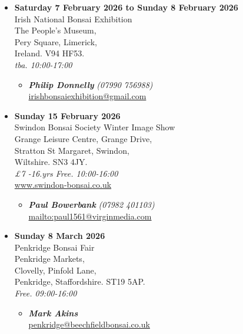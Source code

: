 \begin{itemize}
    \item \textbf{Saturday 7 February 2026 to Sunday 8 February 2026}
    \\
    Irish National Bonsai Exhibition \\
    The People's Museum, \\
    Pery Square, Limerick, \\
    Ireland. V94 HF53.
    \\
    \emph{tba. 10:00-17:00}
    \begin{itemize}
        \item \textbf{\emph{Philip Donnelly}} \emph{(07990 756988)} \\
        \href{mailto:irishbonsaiexhibition@gmail.com}{irishbonsaiexhibition@gmail.com} 
    \end{itemize}

    \item \textbf{Sunday 15 February 2026}
    \\
    Swindon Bonsai Society Winter Image Show \\
    Grange Leisure Centre, Grange Drive, \\
    Stratton St Margaret, Swindon, \\
    Wiltshire. SN3 4JY.
    \\
    \emph{£7 -16.yrs Free. 10:00-16:00}
    \\
    \href{http://www.swindon-bonsai.co.uk/}{www.swindon-bonsai.co.uk}
    \begin{itemize}
        \item \textbf{\emph{Paul Bowerbank}} \emph{(07982 401103)} \\
        \href{mailto:mailto:paul1561@virginmedia.com}{mailto:paul1561@virginmedia.com} 
    \end{itemize}

    \item \textbf{Sunday 8 March 2026}
    \\
    Penkridge Bonsai Fair \\
    Penkridge Markets, \\
    Clovelly, Pinfold Lane, \\
    Penkridge, Staffordshire. ST19 5AP.
    \\
    \emph{Free. 09:00-16:00}
    \begin{itemize}
        \item \textbf{\emph{Mark Akins}} \\
        \href{mailto:penkridge@beechfieldbonsai.co.uk}{penkridge@beechfieldbonsai.co.uk} 
    \end{itemize}


\end{itemize}
